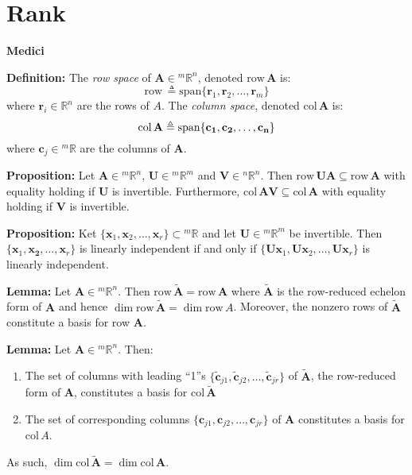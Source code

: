 \documentclass{article}
\newcommand{\bff}[1]{\mathbf{#1}}
\newcommand{\spann}[1]{\mathrm{span}\{#1\}}
\newcommand{\col}[1]{\mathrm{col}\,#1}
\newcommand{\row}[1]{\mathrm{row}\,#1}
\newcommand{\red}[1]{\widetilde{#1}}
\begin{document}
    \section{Rank}
    \begin{minipage}[t]{.45\textwidth} %
        \begin{center}
            \textbf{Medici}
        \end{center}
        \textbf{Definition:} The \textit{row space} of $\bff{A} \in {^m}\mathbb{R}^n$, denoted $\row \bff{A}$ is:
        \begin{equation*}
            \row \triangleq \spann{\bff{r}_1,\bff{r}_2,\dots,\bff{r}_m}
        \end{equation*}
        where $\bff{r}_i \in \mathbb{R}^n$ are the rows of $A$. The \textit{column space}, denoted $\col \bff{A}$ is:
        \begin{equation*}
            \col \bf{A} \triangleq \spann{\bff{c}_1,\bff{c}_2,\dots,\bff{c}_n}
        \end{equation*}
        where $\bff{c}_j \in {^m}\mathbb{R}$ are the columns of $\bff{A}$.
        \vspace{2mm}

        \textbf{Proposition:} Let $\bff{A} \in {^m}\mathbb{R}^n$, $\bff{U} \in {^m}\mathbb{R}^m$ and $\bff{V} \in {^n}\mathbb{R}^n$. Then $\row \bff{UA} \subseteq \row \bff{A}$ with equality holding if $\bff{U}$ is invertible. Furthermore, $\col \bff{AV} \subseteq \col \bff{A}$ with equality holding if $\bff{V}$ is invertible.
        \vspace{2mm}

        \textbf{Proposition:} Ket $\{\bff{x}_1, \bff{x}_2, \dots, \bff{x}_r\} \subset {^m}\mathbb{R}$ and let $\bff{U} \in {^m}\mathbb{R}^m$ be invertible. Then $\{\bff{x}_1,\bff{x_2},\dots,\bff{x}_r\}$ is linearly independent if and only if $\{\bff{Ux}_1,\bff{Ux}_2,\dots,\bff{Ux}_r\}$ is linearly independent.
        \vspace{2mm}

        \textbf{Lemma:} Let $\bff{A} \in {^m}\mathbb{R}^n$. Then $\row \red{\bff{A}} = \row \bff{A}$ where $\red{\bff{A}}$ is the row-reduced echelon form of $\bff{A}$ and hence $\dim \row \red{\bff{A}} = \dim \row A$. Moreover, the nonzero rows of $\red{\bff{A}}$ constitute a basis for row $\bff{A}$.
        \vspace{2mm}
        
        \textbf{Lemma:} Let $\bff{A} \in {^m}\mathbb{R}^n$. Then:
        \begin{enumerate}
            \item The set of columns with leading ``1''s $\{\red{\bff{c}}_{j1}, \red{\bff{c}}_{j2},\dots, \red{\bff{c}}_{jr}\}$ of $\red{\bff{A}}$, the row-reduced form of $\bff{A}$, constitutes a basis for $\col \red{\bff{A}}$
            \item The set of corresponding columns $\{\bff{c}_{j1},\bff{c}_{j2},\dots,\bff{c}_{jr}\}$ of $\bff{A}$ constitutes a basis for $\col A$.
        \end{enumerate}
        As such, $\dim \col \red{\bff{A}} = \dim \col \bff{A}$.
        \vspace{2mm}
        

\end{minipage}
\end{document}
